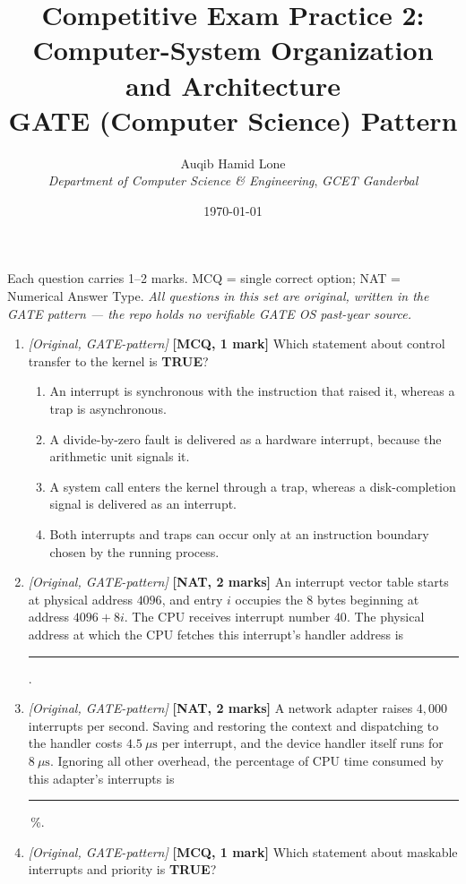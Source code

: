 \documentclass[11pt]{article}
\title{Competitive Exam Practice 2: Computer-System Organization and Architecture\\\large GATE (Computer Science) Pattern}
\author{Auqib Hamid Lone\\[0.3em]
  \emph{Department of Computer Science \& Engineering}, \emph{GCET Ganderbal}}
\date{\today}
\begin{document}
\maketitle

\noindent Each question carries 1--2 marks. MCQ = single correct option; NAT = Numerical Answer Type. \emph{All questions in this set are original, written in the GATE pattern --- the repo holds no verifiable GATE OS past-year source.}

\begin{enumerate}
\item[\textbf{Q1}] \textit{[Original, GATE-pattern]} \textbf{[MCQ, 1 mark]} Which statement about control transfer to the kernel is \textbf{TRUE}?

\begin{enumerate}
  \item[(A)] An interrupt is synchronous with the instruction that raised it, whereas a trap is asynchronous.
  \item[(B)] A divide-by-zero fault is delivered as a hardware interrupt, because the arithmetic unit signals it.
  \item[(C)] A system call enters the kernel through a trap, whereas a disk-completion signal is delivered as an interrupt.
  \item[(D)] Both interrupts and traps can occur only at an instruction boundary chosen by the running process.
\end{enumerate}

\item[\textbf{Q2}] \textit{[Original, GATE-pattern]} \textbf{[NAT, 2 marks]} An interrupt vector table starts at physical address $4096$, and entry $i$ occupies the 8 bytes beginning at address $4096 + 8i$. The CPU receives interrupt number $40$. The physical address at which the CPU fetches this interrupt's handler address is \rule{1.5cm}{0.4pt}.

\item[\textbf{Q3}] \textit{[Original, GATE-pattern]} \textbf{[NAT, 2 marks]} A network adapter raises $4{,}000$ interrupts per second. Saving and restoring the context and dispatching to the handler costs $4.5\ \mu\text{s}$ per interrupt, and the device handler itself runs for $8\ \mu\text{s}$. Ignoring all other overhead, the percentage of CPU time consumed by this adapter's interrupts is \rule{1.5cm}{0.4pt}\,\%.

\item[\textbf{Q4}] \textit{[Original, GATE-pattern]} \textbf{[MCQ, 1 mark]} Which statement about maskable interrupts and priority is \textbf{TRUE}?


\end{enumerate}
\end{document}
